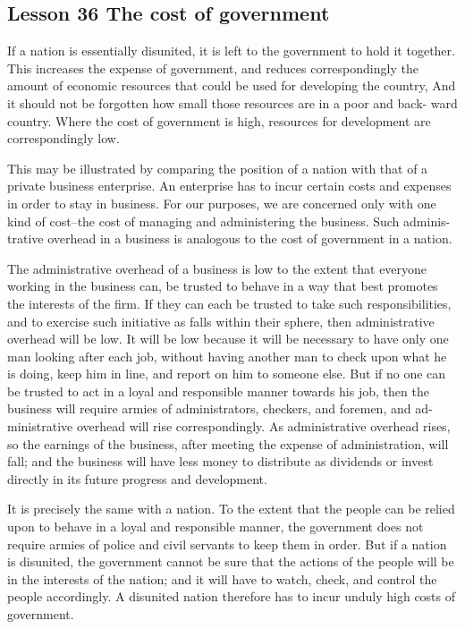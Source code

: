 \documentclass[kindlepaper]{BHCexam4kindle}
\begin{document}
\subsection{Lesson 36
The cost of government}
\par
If a nation is essentially disunited, it is left to the government to hold it together.
This increases the expense of government, and reduces correspondingly the
amount of economic resources that could be used for developing the country,
And it should not be forgotten how small those resources are in a poor and back-
ward country. Where the cost of government is high, resources for development
are correspondingly low.
\par
This may be illustrated by comparing the position of a nation with that of a
private business enterprise. An enterprise has to incur certain costs and expenses
in order to stay in business. For our purposes, we are concerned only with one
kind of cost--the cost of managing and administering the business. Such adminis-
trative overhead in a business is analogous to the cost of government in a nation.
\par
The administrative overhead of a business is low to the extent that everyone
working in the business can, be trusted to behave in a way that best promotes the
interests of the firm. If they can each be trusted to take such responsibilities,
and to exercise such initiative as falls within their sphere, then administrative
overhead will be low. It will be low because it will be necessary to have only one
man looking after each job, without having another man to check upon what he
is doing, keep him in line, and report on him to someone else. But if no one can
be trusted to act in a loyal and responsible manner towards his job, then the
business will require armies of administrators, checkers, and foremen, and ad-
ministrative overhead will rise correspondingly. As administrative overhead rises,
so the earnings of the business, after meeting the expense of administration, will
fall; and the business will have less money to distribute as dividends or invest
directly in its future progress and development.
\par
It is precisely the same with a nation. To the extent that the people can be
relied upon to behave in a loyal and responsible manner, the government does
not require armies of police and civil servants to keep them in order. But if a
nation is disunited, the government cannot be sure that the actions of the people
will be in the interests of the nation; and it will have to watch, check, and control
the people accordingly. A disunited nation therefore has to incur unduly high
costs of government.
\clearpage
\end{document}
